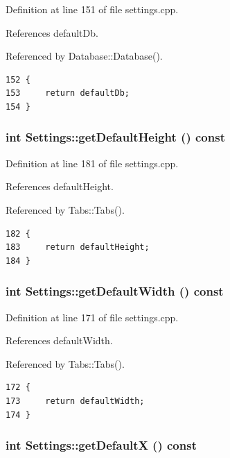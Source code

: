 Definition at line 151 of file settings.cpp.

References default\-Db.

Referenced by Database::Database().

\footnotesize\begin{verbatim}152 {
153     return defaultDb;
154 }
\end{verbatim}\normalsize 


\hypertarget{classSettings_a13}{
\subsubsection[getDefaultHeight]{\setlength{\rightskip}{0pt plus 5cm}int Settings::get\-Default\-Height () const}}
\label{classSettings_a13}


Definition at line 181 of file settings.cpp.

References default\-Height.

Referenced by Tabs::Tabs().

\footnotesize\begin{verbatim}182 {
183     return defaultHeight;
184 }
\end{verbatim}\normalsize 


\hypertarget{classSettings_a11}{
\subsubsection[getDefaultWidth]{\setlength{\rightskip}{0pt plus 5cm}int Settings::get\-Default\-Width () const}}
\label{classSettings_a11}


Definition at line 171 of file settings.cpp.

References default\-Width.

Referenced by Tabs::Tabs().

\footnotesize\begin{verbatim}172 {
173     return defaultWidth;
174 }
\end{verbatim}\normalsize 


\hypertarget{classSettings_a15}{
\subsubsection[getDefaultX]{\setlength{\rightskip}{0pt plus 5cm}int Settings::get\-Default\-X () const}}
\label{classSettings_a15}


